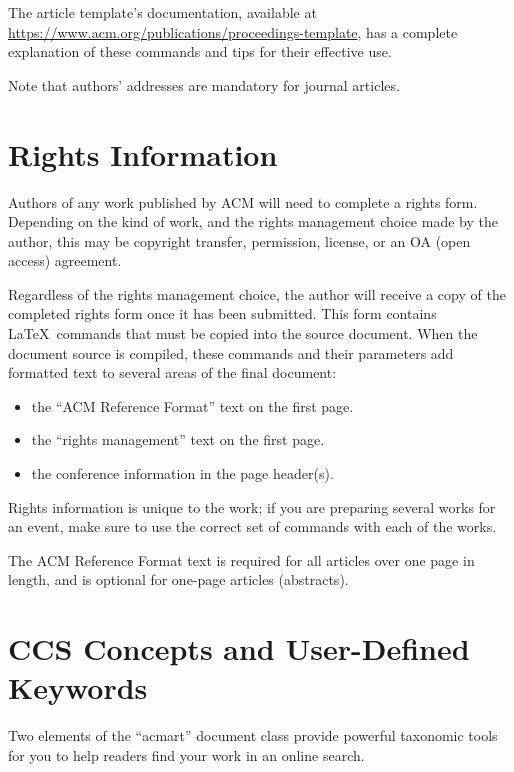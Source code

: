 \documentclass[
  letterpaper,
  DIV=11,
  numbers=noendperiod]{scrartcl}
\providecommand{\tightlist}{%
  \setlength{\itemsep}{0pt}\setlength{\parskip}{0pt}}\usepackage{longtable,booktabs,array}
\begin{document}
The article template's documentation, available at
\url{https://www.acm.org/publications/proceedings-template}, has a
complete explanation of these commands and tips for their effective use.

Note that authors' addresses are mandatory for journal articles.

\hypertarget{rights-information}{%
\section{Rights Information}\label{rights-information}}

Authors of any work published by ACM will need to complete a rights
form. Depending on the kind of work, and the rights management choice
made by the author, this may be copyright transfer, permission, license,
or an OA (open access) agreement.

Regardless of the rights management choice, the author will receive a
copy of the completed rights form once it has been submitted. This form
contains \LaTeX~commands that must be copied into the source document.
When the document source is compiled, these commands and their
parameters add formatted text to several areas of the final document:

\begin{itemize}
\tightlist
\item
  the ``ACM Reference Format'' text on the first page.
\item
  the ``rights management'' text on the first page.
\item
  the conference information in the page header(s).
\end{itemize}

Rights information is unique to the work; if you are preparing several
works for an event, make sure to use the correct set of commands with
each of the works.

The ACM Reference Format text is required for all articles over one page
in length, and is optional for one-page articles (abstracts).

\hypertarget{ccs-concepts-and-user-defined-keywords}{%
\section{CCS Concepts and User-Defined
Keywords}\label{ccs-concepts-and-user-defined-keywords}}

Two elements of the ``acmart'' document class provide powerful taxonomic
tools for you to help readers find your work in an online search.
\end{document}
